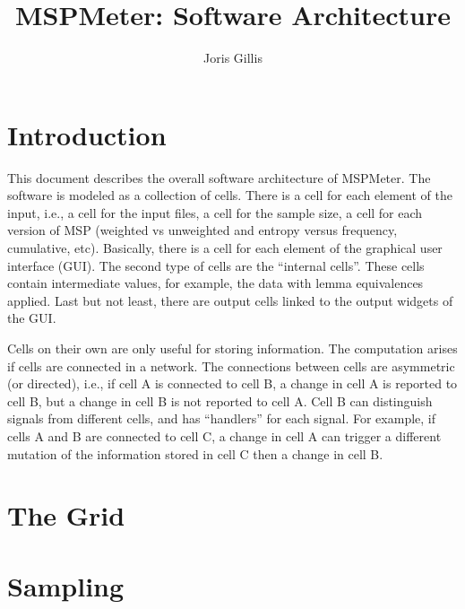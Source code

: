 \documentclass{article}
\title{MSPMeter: Software Architecture}
\author{Joris Gillis}
\begin{document}
\maketitle


\section{Introduction}

This document describes the overall software architecture of MSPMeter. The software is modeled as a collection of cells. There is a cell for each element of the input, i.e., a cell for the input files, a cell for the sample size, a cell for each version of MSP (weighted vs unweighted and entropy versus frequency, cumulative, etc). Basically, there is a cell for each element of the graphical user interface (GUI). The second type of cells are the ``internal cells''. These cells contain intermediate values, for example, the data with lemma equivalences applied. Last but not least, there are output cells linked to the output widgets of the GUI. 

Cells on their own are only useful for storing information. The computation arises if cells are connected in a network. The connections between cells are asymmetric (or directed), i.e., if cell A is connected to cell B, a change in cell A is reported to cell B, but a change in cell B is not reported to cell A. Cell B can distinguish signals from different cells, and has ``handlers'' for each signal. For example, if cells A and B are connected to cell C, a change in cell A can trigger a different mutation of the information stored in cell C then a change in cell B. 


\section{The Grid}




\section{Sampling}
\end{document}
